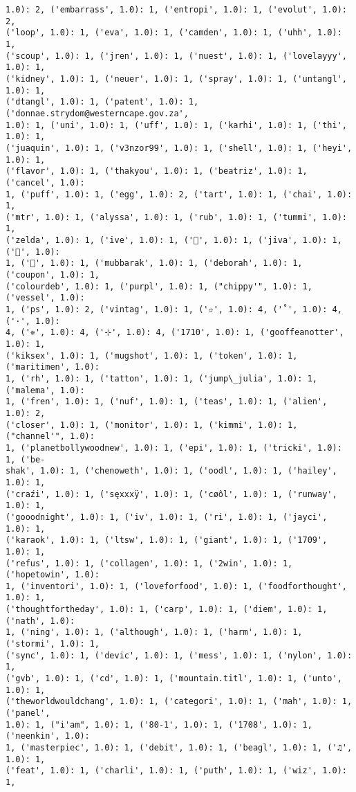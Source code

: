 \documentclass[11pt]{article}
\begin{document}
\begin{Verbatim}[commandchars=\\\{\}]
1.0): 2, ('embarrass', 1.0): 1, ('entropi', 1.0): 1, ('evolut', 1.0): 2,
('loop', 1.0): 1, ('eva', 1.0): 1, ('camden', 1.0): 1, ('uhh', 1.0): 1,
('scoup', 1.0): 1, ('jren', 1.0): 1, ('nuest', 1.0): 1, ('lovelayyy', 1.0): 1,
('kidney', 1.0): 1, ('neuer', 1.0): 1, ('spray', 1.0): 1, ('untangl', 1.0): 1,
('dtangl', 1.0): 1, ('patent', 1.0): 1, ('donnae.strydom@westerncape.gov.za',
1.0): 1, ('uni', 1.0): 1, ('uff', 1.0): 1, ('karhi', 1.0): 1, ('thi', 1.0): 1,
('juaquin', 1.0): 1, ('v3nzor99', 1.0): 1, ('shell', 1.0): 1, ('heyi', 1.0): 1,
('flavor', 1.0): 1, ('thakyou', 1.0): 1, ('beatriz', 1.0): 1, ('cancel', 1.0):
1, ('puff', 1.0): 1, ('egg', 1.0): 2, ('tart', 1.0): 1, ('chai', 1.0): 1,
('mtr', 1.0): 1, ('alyssa', 1.0): 1, ('rub', 1.0): 1, ('tummi', 1.0): 1,
('zelda', 1.0): 1, ('ive', 1.0): 1, ('🎂', 1.0): 1, ('jiva', 1.0): 1, ('🍹', 1.0):
1, ('🍻', 1.0): 1, ('mubbarak', 1.0): 1, ('deborah', 1.0): 1, ('coupon', 1.0): 1,
('colourdeb', 1.0): 1, ('purpl', 1.0): 1, ("chippy'", 1.0): 1, ('vessel', 1.0):
1, ('ps', 1.0): 2, ('vintag', 1.0): 1, ('✫', 1.0): 4, ('˚', 1.0): 4, ('·', 1.0):
4, ('✵', 1.0): 4, ('⊹', 1.0): 4, ('1710', 1.0): 1, ('gooffeanotter', 1.0): 1,
('kiksex', 1.0): 1, ('mugshot', 1.0): 1, ('token', 1.0): 1, ('maritimen', 1.0):
1, ('rh', 1.0): 1, ('tatton', 1.0): 1, ('jump\_julia', 1.0): 1, ('malema', 1.0):
1, ('fren', 1.0): 1, ('nuf', 1.0): 1, ('teas', 1.0): 1, ('alien', 1.0): 2,
('closer', 1.0): 1, ('monitor', 1.0): 1, ('kimmi', 1.0): 1, ("channel'", 1.0):
1, ('planetbollywoodnew', 1.0): 1, ('epi', 1.0): 1, ('tricki', 1.0): 1, ('be-
shak', 1.0): 1, ('chenoweth', 1.0): 1, ('oodl', 1.0): 1, ('hailey', 1.0): 1,
('craźi', 1.0): 1, ('sęxxxÿ', 1.0): 1, ('cøôl', 1.0): 1, ('runway', 1.0): 1,
('gooodnight', 1.0): 1, ('iv', 1.0): 1, ('ri', 1.0): 1, ('jayci', 1.0): 1,
('karaok', 1.0): 1, ('ltsw', 1.0): 1, ('giant', 1.0): 1, ('1709', 1.0): 1,
('refus', 1.0): 1, ('collagen', 1.0): 1, ('2win', 1.0): 1, ('hopetowin', 1.0):
1, ('inventori', 1.0): 1, ('loveforfood', 1.0): 1, ('foodforthought', 1.0): 1,
('thoughtfortheday', 1.0): 1, ('carp', 1.0): 1, ('diem', 1.0): 1, ('nath', 1.0):
1, ('ning', 1.0): 1, ('although', 1.0): 1, ('harm', 1.0): 1, ('stormi', 1.0): 1,
('sync', 1.0): 1, ('devic', 1.0): 1, ('mess', 1.0): 1, ('nylon', 1.0): 1,
('gvb', 1.0): 1, ('cd', 1.0): 1, ('mountain.titl', 1.0): 1, ('unto', 1.0): 1,
('theworldwouldchang', 1.0): 1, ('categori', 1.0): 1, ('mah', 1.0): 1, ('panel',
1.0): 1, ("i'am", 1.0): 1, ('80-1', 1.0): 1, ('1708', 1.0): 1, ('neenkin', 1.0):
1, ('masterpiec', 1.0): 1, ('debit', 1.0): 1, ('beagl', 1.0): 1, ('♫', 1.0): 1,
('feat', 1.0): 1, ('charli', 1.0): 1, ('puth', 1.0): 1, ('wiz', 1.0): 1,

\end{Verbatim}
\end{document}
